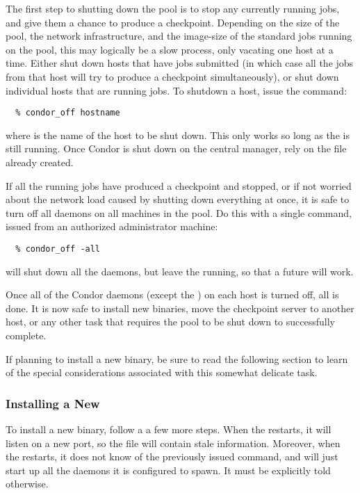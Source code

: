 The first step to shutting down the pool is to stop any currently
running jobs, and give them a chance to produce a checkpoint.
Depending on the size of the pool, the network infrastructure, and
the image-size of the standard jobs running on the pool,
this may logically be
a slow process, only vacating one host at a time.
Either shut down hosts that have jobs submitted (in which case
all the jobs from that host will try to produce a checkpoint simultaneously),
or shut down individual hosts that are running jobs.
To shutdown a host, issue the command:
\begin{verbatim}
  % condor_off hostname
\end{verbatim}
where  is the name of the host to be shut down.
This only works so long as the  is still
running.
Once Condor is shut down on the central manager,
rely on the  file already created.

If all the running jobs have produced a checkpoint and stopped,
or if not
worried about the network load caused by shutting down
everything at once, it is safe to turn off all daemons on all machines
in the pool.
Do this with a single command, issued from an authorized
administrator machine:
\begin{verbatim}
  % condor_off -all
\end{verbatim}

 will shut down all the daemons, but leave the
 running, so that a future  will work.

Once all of the Condor daemons (except the ) on each
host is turned off, all is done.
It is now safe to install new binaries, move the checkpoint server
to another host, or any other task that requires the pool to be
shut down to successfully complete.

If planning to install a new  binary, be
sure to read the following section to learn of the special considerations 
associated with
this somewhat delicate task.

\subsubsection{\label{sec:New-Master}Installing a New }

To install a new  binary, follow a
a few more steps.
When the  restarts, it will listen on a new port,
so the  file will contain stale information.
Moreover, when the  restarts,
it does not know of the previously issued
 command, and will just start up all the daemons
it is configured to spawn.
It must be explicitly told otherwise.


